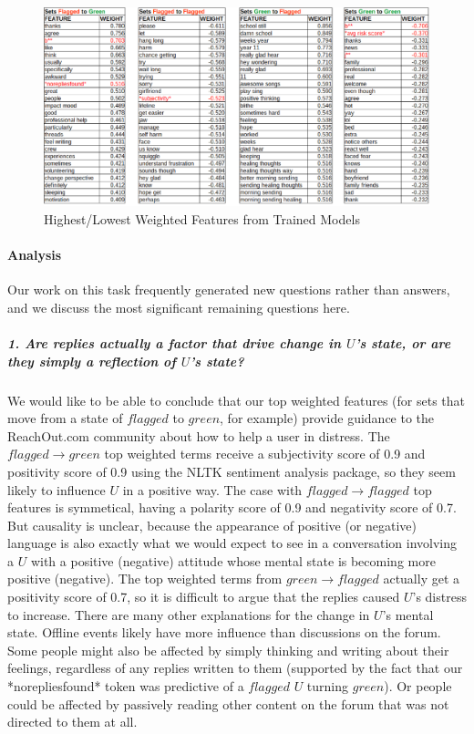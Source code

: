 \documentclass{article}
\begin{document}
\begin{figure}[h!]
    \includegraphics[width=16cm]{topfeatures}
    \caption{Highest/Lowest Weighted Features from Trained Models}
\end{figure}

\paragraph{Analysis}Our work on this task frequently generated new questions rather than answers, and we discuss the most significant remaining questions here.

\subparagraph{1. Are replies actually a factor that drive change in $U$'s state, or are they simply a reflection of $U$'s state?}We would like to be able to conclude that our top weighted features (for sets that move from a state of $flagged$ to $green$, for example) provide guidance to the ReachOut.com community about how to help a user in distress. The $flagged \rightarrow green$ top weighted terms receive a subjectivity score of 0.9 and positivity score of 0.9 using the NLTK sentiment analysis package, so they seem likely to influence $U$ in a positive way. The case with $flagged \rightarrow flagged$ top features is symmetical, having a polarity score of 0.9 and negativity score of 0.7. But causality is unclear, because the appearance of positive (or negative) language is also exactly what we would expect to see in a conversation involving a $U$ with a positive (negative) attitude whose mental state is becoming more positive (negative). The top weighted terms from $green \rightarrow flagged$ actually get a positivity score of 0.7, so it is difficult to argue that the replies caused $U$'s distress to increase. There are many other explanations for the change in $U$'s mental state. Offline events likely have more influence than discussions on the forum. Some people might also be affected by simply thinking and writing about their feelings, regardless of any replies written to them (supported by the fact that our *norepliesfound* token was predictive of a $flagged$ $U$ turning $green$). Or people could be affected by passively reading other content on the forum that was not directed to them at all.
\end{document}
